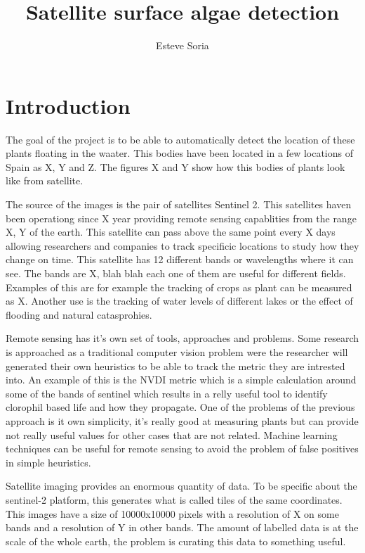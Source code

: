 \documentclass[notitlepage]{report}
\title{Satellite surface algae detection}
\author{Esteve Soria}
\begin{document}
    \maketitle
    \thispagestyle{empty}

    \begin{abstract}
        \lipsum[1]
    \end{abstract}


    \section*{Introduction}
    The goal of the project is to be able to automatically detect the location of these plants 
    floating in the waater.
    This bodies have been located in a few locations of Spain as X, Y and Z. The figures X and Y
    show how this bodies of plants look like from satellite.
    
    The source of the images is the pair of satellites Sentinel 2. This satellites haven been operationg since X year providing remote sensing capablities from the range X, Y of the earth.
    This satellite can pass above the same point every X days allowing researchers and companies to
    track specificic locations to study how they change on time.
    This satellite has 12 different bands or wavelengths where it can see. The bands are X, blah blah
    each one of them are useful for different fields.
    Examples of this are for example the tracking of crops as plant can be measured as X.
    Another use is the tracking of water levels of different lakes or the effect of flooding and
    natural catasprohies.
    
    Remote sensing has it's own set of tools, approaches and problems.
    Some research is approached as a traditional computer vision problem were the researcher will
    generated their own heuristics to be able to track the metric they are intrested into.
    An example of this is the NVDI metric which is a simple calculation around some of the bands of 
    sentinel which results in a relly useful tool to identify clorophil based life and how they
    propagate.
    One of the problems of the previous approach is it own simplicity, it's really good at measuring
    plants but can provide not really useful values for other cases that are not related.
    Machine learning techniques can be useful for remote sensing to avoid the problem of false
    positives in simple heuristics.
    
    Satellite imaging provides an enormous quantity of data. To be specific about the sentinel-2
    platform, this generates what is called tiles of the same coordinates. This images have a size
    of 10000x10000 pixels with a resolution of X on some bands and a resolution of Y in other bands.
    The amount of labelled data is at the scale of the whole earth, the problem is curating this
    data to something useful.
    
\end{document}
